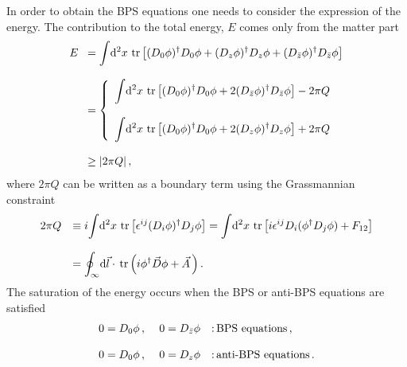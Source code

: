 \documentclass[a4paper,12pt]{article}
\def\tr{{\mbox{\,tr}}}
\begin{document}
In order to obtain the BPS equations one needs to consider the expression of the energy.  The contribution to the
total energy, $E$ comes only from the matter part
\begin{equation}
\begin{array}{ll}
E&\!=\displaystyle{\int}{\rm
d}^{2}x\,\tr\left[(D_{0}\phi)^{\dagger}D_{0}\phi+(D_{z}\phi)^{\dagger}D_{z}
\phi+(D_{\bar{z}}\phi)^{\dagger}D_{\bar{z}}\phi\right]\\
{}&{}\\
{}&\!=\left\{\begin{array}{l}
\displaystyle{\int}{\rm
d}^{2}x\,\tr\left[(D_{0}\phi)^{\dagger}D_{0}\phi+2(D_{\bar{z}}\phi)^{\dagger}
D_{\bar{z}}\phi\right]-2\pi Q\\
{}\\
\displaystyle{\int}{\rm
d}^{2}x\,\tr\left[(D_{0}\phi)^{\dagger}D_{0}\phi+2(D_{z}\phi)^{\dagger}D_{z}\phi\right]+2\pi
Q
\end{array}\right.\\
{}&{}\\
{}&\!\geq |2\pi Q|\,,
\end{array}
\end{equation}
where $2\pi Q$ can be written as a boundary term using the Grassmannian
constraint
\begin{equation}
\begin{array}{ll}
2\pi Q&\equiv i\displaystyle{\int}{\rm
d}^{2}x\,\tr\left[\epsilon^{ij}(D_{i}\phi)^{\dagger}D_{j}\phi\right]
=\displaystyle{\int}{\rm
d}^{2}x\,\tr\left[i\epsilon^{ij}D_{i}(\phi^{\dagger}D_{j}\phi)+F_{12}\right]\\
{}&{}\\
{}&=\displaystyle{\oint_{\infty}}{\rm d}\vec{l}\cdot{\tr
\left(i\phi^{\dagger}\vec{D}\phi+\vec{A}\,\right)}\,.
\end{array}
\label{tr1}
\end{equation}
The saturation of the energy occurs  when the BPS or anti-BPS equations are
satisfied
\begin{equation}
\begin{array}{lll}
0=D_{0}\phi\,,~&0=D_{\bar{z}}\phi&\mbox{:\,BPS~equations}\,,\\
{}&{}&{}\\
0=D_{0}\phi\,,~&0=D_{z}\phi&\mbox{:\,anti-BPS~equations}\,.
\end{array}
\label{BPSeq}
\end{equation}
\end{document}
